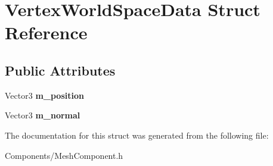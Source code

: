 \hypertarget{structVertexWorldSpaceData}{}\section{Vertex\+World\+Space\+Data Struct Reference}
\label{structVertexWorldSpaceData}
\subsection*{Public Attributes}
\begin{DoxyCompactItemize}
\item 
\mbox{\label{structVertexWorldSpaceData_a92848f60e254e7060864b994e58bec62}} 
Vector3 {\bfseries m\+\_\+position}
\item 
\mbox{\label{structVertexWorldSpaceData_a4dcffab7f3019ef5590c44f36fb3ed7f}} 
Vector3 {\bfseries m\+\_\+normal}
\end{DoxyCompactItemize}


The documentation for this struct was generated from the following file\+:\begin{DoxyCompactItemize}
\item 
Components/Mesh\+Component.\+h\end{DoxyCompactItemize}
